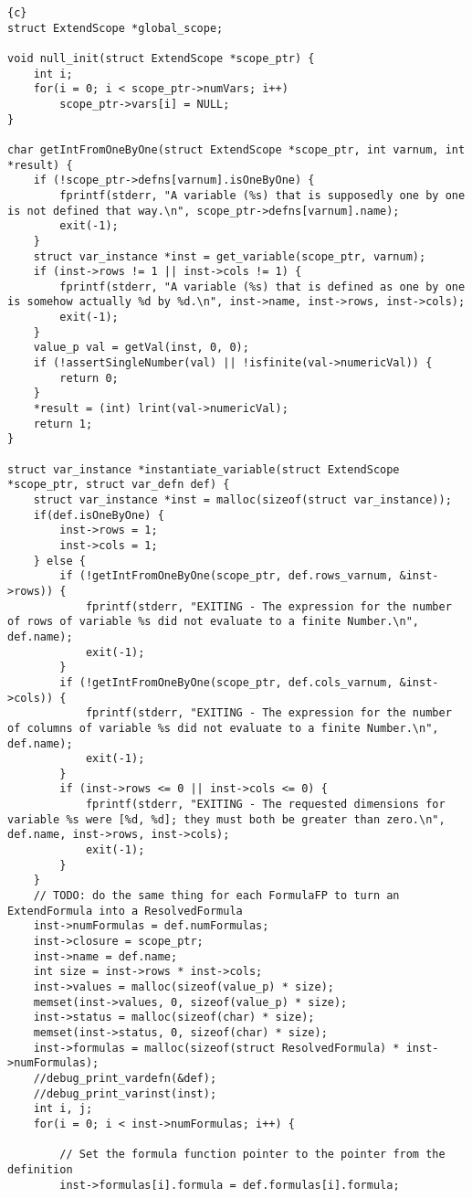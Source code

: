 \begin{lstlisting}{c}
struct ExtendScope *global_scope;

void null_init(struct ExtendScope *scope_ptr) {
	int i;
	for(i = 0; i < scope_ptr->numVars; i++)
		scope_ptr->vars[i] = NULL;
}

char getIntFromOneByOne(struct ExtendScope *scope_ptr, int varnum, int *result) {
	if (!scope_ptr->defns[varnum].isOneByOne) {
		fprintf(stderr, "A variable (%s) that is supposedly one by one is not defined that way.\n", scope_ptr->defns[varnum].name);
		exit(-1);
	}
	struct var_instance *inst = get_variable(scope_ptr, varnum);
	if (inst->rows != 1 || inst->cols != 1) {
		fprintf(stderr, "A variable (%s) that is defined as one by one is somehow actually %d by %d.\n", inst->name, inst->rows, inst->cols);
		exit(-1);
	}
	value_p val = getVal(inst, 0, 0);
	if (!assertSingleNumber(val) || !isfinite(val->numericVal)) {
		return 0;
	}
	*result = (int) lrint(val->numericVal);
	return 1;
}

struct var_instance *instantiate_variable(struct ExtendScope *scope_ptr, struct var_defn def) {
	struct var_instance *inst = malloc(sizeof(struct var_instance));
	if(def.isOneByOne) {
		inst->rows = 1;
		inst->cols = 1;
	} else {
		if (!getIntFromOneByOne(scope_ptr, def.rows_varnum, &inst->rows)) {
			fprintf(stderr, "EXITING - The expression for the number of rows of variable %s did not evaluate to a finite Number.\n", def.name);
			exit(-1);
		}
		if (!getIntFromOneByOne(scope_ptr, def.cols_varnum, &inst->cols)) {
			fprintf(stderr, "EXITING - The expression for the number of columns of variable %s did not evaluate to a finite Number.\n", def.name);
			exit(-1);
		}
		if (inst->rows <= 0 || inst->cols <= 0) {
			fprintf(stderr, "EXITING - The requested dimensions for variable %s were [%d, %d]; they must both be greater than zero.\n", def.name, inst->rows, inst->cols);
			exit(-1);
		}
	}
	// TODO: do the same thing for each FormulaFP to turn an ExtendFormula into a ResolvedFormula
	inst->numFormulas = def.numFormulas;
	inst->closure = scope_ptr;
	inst->name = def.name;
	int size = inst->rows * inst->cols;
	inst->values = malloc(sizeof(value_p) * size);
	memset(inst->values, 0, sizeof(value_p) * size);
	inst->status = malloc(sizeof(char) * size);
	memset(inst->status, 0, sizeof(char) * size);
	inst->formulas = malloc(sizeof(struct ResolvedFormula) * inst->numFormulas);
	//debug_print_vardefn(&def);
	//debug_print_varinst(inst);
	int i, j;
	for(i = 0; i < inst->numFormulas; i++) {

		// Set the formula function pointer to the pointer from the definition
		inst->formulas[i].formula = def.formulas[i].formula;


\end{lstlisting}
